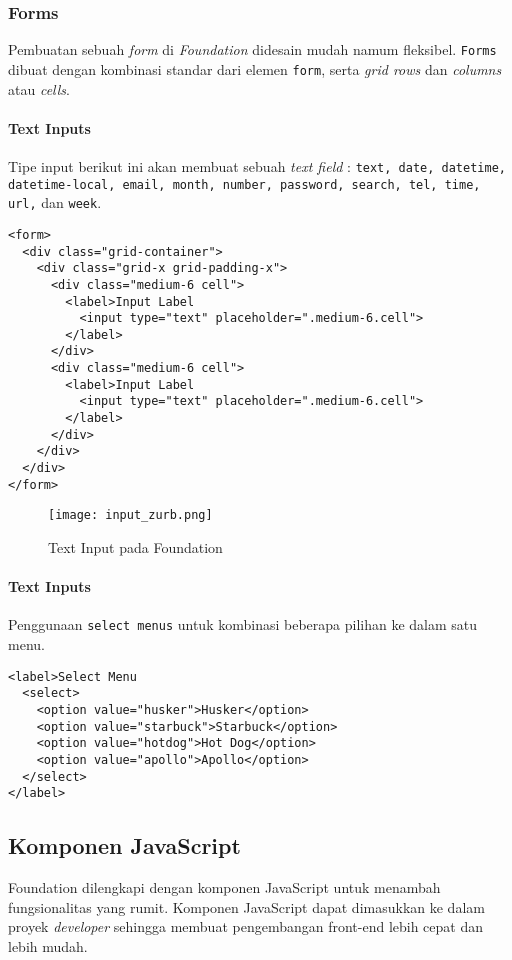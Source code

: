 \subsubsection{Forms}
\label{sssec:css_3}
Pembuatan sebuah \textit{form} di \textit{Foundation} didesain mudah namum fleksibel. \texttt{Forms} dibuat dengan kombinasi standar dari elemen \texttt{form}, serta \textit{grid rows} dan \textit{columns} atau \textit{cells}. \cite{zurbfoundation:17}

\paragraph{Text Inputs}
Tipe input berikut ini akan membuat sebuah \textit{text field} : \verb|text, date, datetime, datetime-local, email, month, number, password, search, tel, time, url,| dan \verb|week|.

\begin{lstlisting}[frame=single] 
<form>
  <div class="grid-container">
    <div class="grid-x grid-padding-x">
      <div class="medium-6 cell">
        <label>Input Label
          <input type="text" placeholder=".medium-6.cell">
        </label>
      </div>
      <div class="medium-6 cell">
        <label>Input Label
          <input type="text" placeholder=".medium-6.cell">
        </label>
      </div>
    </div>
  </div>
</form>
\end{lstlisting}

\begin{figure} [H]
	\centering  
	\texttt{[image: input\_zurb.png]}  
	\caption{Text Input pada Foundation}
	\label{fig:gridbasic_zurb} 
\end{figure}

\paragraph{Text Inputs}
Penggunaan \texttt{select menus} untuk kombinasi beberapa pilihan ke dalam satu menu.
\begin{lstlisting}[frame=single] 
<label>Select Menu
  <select>
    <option value="husker">Husker</option>
    <option value="starbuck">Starbuck</option>
    <option value="hotdog">Hot Dog</option>
    <option value="apollo">Apollo</option>
  </select>
</label>
\end{lstlisting}\cite{zurbfoundation:17}

\subsection{Komponen JavaScript}
\label{subs:javascript_zurb}
Foundation dilengkapi dengan komponen JavaScript untuk menambah fungsionalitas yang rumit. Komponen JavaScript dapat dimasukkan ke dalam proyek \textit{developer} sehingga membuat pengembangan front-end lebih cepat dan lebih mudah.


